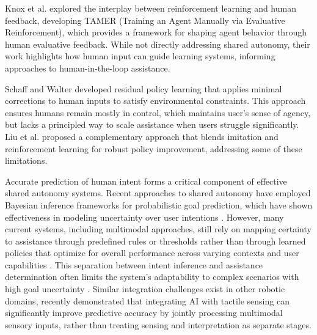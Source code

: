 \documentclass[11pt]{article}
\begin{document}
Knox et al. \cite{knox} explored the interplay between reinforcement learning and human feedback, developing TAMER (Training an Agent Manually via Evaluative Reinforcement), which provides a framework for shaping agent behavior through human evaluative feedback. While not directly addressing shared autonomy, their work highlights how human input can guide learning systems, informing approaches to human-in-the-loop assistance.

Schaff and Walter \cite{schaff} developed residual policy learning that applies minimal corrections to human inputs to satisfy environmental constraints. This approach ensures humans remain mostly in control, which maintains user's sense of agency, but lacks a principled way to scale assistance when users struggle significantly. Liu et al. \cite{liu2023} proposed a complementary approach that blends imitation and reinforcement learning for robust policy improvement, addressing some of these limitations.


Accurate prediction of human intent forms a critical component of effective shared autonomy systems. Recent approaches to shared autonomy have employed Bayesian inference frameworks for probabilistic goal prediction, which have shown effectiveness in modeling uncertainty over user intentions \cite{jain2018, jain2019}. However, many current systems, including multimodal approaches, still rely on mapping certainty to assistance through predefined rules or thresholds rather than through learned policies that optimize for overall performance across varying contexts and user capabilities \cite{IDA, jonnavittula2022}. This separation between intent inference and assistance determination often limits the system's adaptability to complex scenarios with high goal uncertainty \cite{DQN}. Similar integration challenges exist in other robotic domains, \cite{goshtasbi} recently demonstrated that integrating AI with tactile sensing can significantly improve predictive accuracy by jointly processing multimodal sensory inputs, rather than treating sensing and interpretation as separate stages.
\end{document}
